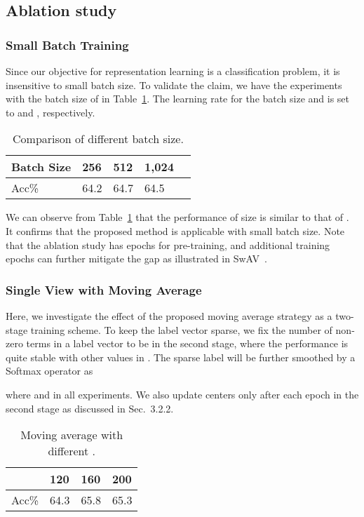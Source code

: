 \documentclass[10pt,twocolumn,letterpaper]{article}
\begin{document}
\subsection{Ablation study}
\subsubsection{Small Batch Training}
Since our objective for representation learning is a classification problem, it is insensitive to small batch size. To validate the claim, we have the experiments with the batch size of  in Table~\ref{tas:bs}. The learning rate for the batch size  and  is set to  and , respectively.
\begin{table}[!ht]
\centering
\begin{tabular}{|l|l|l|l|l|}\hline
Batch Size&256&512&1,024\\\hline
Acc\% &64.2&64.7&64.5 \\\hline
\end{tabular}
\caption{Comparison of different batch size.}\label{tas:bs}
\end{table}
We can observe from Table~\ref{tas:bs} that the performance of size  is similar to that of . It confirms that the proposed method is applicable with small batch size. Note that the ablation study has  epochs for pre-training, and additional training epochs can further mitigate the gap as illustrated in SwAV~\cite{CaronMMGBJ20}.

\subsubsection{Single View with Moving Average}
Here, we investigate the effect of the proposed moving average strategy as a two-stage training scheme. To keep the label vector sparse, we fix the number of non-zero terms in a label vector to be  in the second stage, where the performance is quite stable with other values in . The sparse label will be further smoothed by a Softmax operator as 

where  and  in all experiments. We also update centers only after each epoch in the second stage as discussed in Sec.~3.2.2.

\begin{table}[!ht]
\centering
\begin{tabular}{|l|l|l|l|}\hline
&120&160&200\\\hline
Acc\% &64.3&65.8&65.3 \\\hline
\end{tabular}
\caption{Moving average with different .}\label{tas:twostage}
\end{table}
\end{document}
